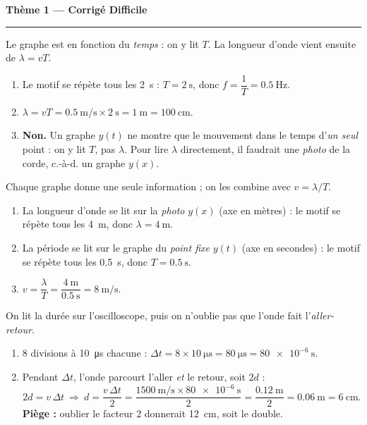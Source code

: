 \documentclass[11pt,a4paper]{article}
\begin{document}
\begin{center}
{\large\bfseries\color{excol} Thème 1 — Corrigé Difficile}\\[-2pt]
{\color{excol}\rule{5cm}{1pt}}
\end{center}

\begin{corrige}
Le graphe est en fonction du \emph{temps} : on y lit $T$. La longueur d'onde vient ensuite de
$\lambda=vT$.
\begin{enumerate}[label=\alph*)]
  \item Le motif se répète tous les \SI{2}{\second} : $T=\SI{2}{\second}$, donc
        $f=\dfrac{1}{T}=\SI{0.5}{\hertz}.$
  \item $\lambda=vT=\SI{0.5}{\metre\per\second}\times\SI{2}{\second}=\SI{1}{\metre}=\SI{100}{\centi\metre}.$
  \item \textbf{Non.} Un graphe $y(t)$ ne montre que le mouvement dans le temps d'\emph{un
        seul} point : on y lit $T$, pas $\lambda$. Pour lire $\lambda$ directement, il faudrait
        une \emph{photo} de la corde, c.-à-d. un graphe $y(x)$.
\end{enumerate}
\end{corrige}

\begin{corrige}
Chaque graphe donne une seule information ; on les combine avec $v=\lambda/T$.
\begin{enumerate}[label=\alph*)]
  \item La longueur d'onde se lit sur la \emph{photo} $y(x)$ (axe en mètres) : le motif se
        répète tous les \SI{4}{\metre}, donc $\lambda=\SI{4}{\metre}.$
  \item La période se lit sur le graphe du \emph{point fixe} $y(t)$ (axe en secondes) : le
        motif se répète tous les \SI{0.5}{\second}, donc $T=\SI{0.5}{\second}.$
  \item $v=\dfrac{\lambda}{T}=\dfrac{\SI{4}{\metre}}{\SI{0.5}{\second}}=\SI{8}{\metre\per\second}.$
\end{enumerate}
\end{corrige}

\begin{corrige}
On lit la durée sur l'oscilloscope, puis on n'oublie pas que l'onde fait l'\emph{aller-retour}.
\begin{enumerate}[label=\alph*)]
  \item 8 divisions à \SI{10}{\micro\second} chacune :
        $\Delta t = 8\times\SI{10}{\micro\second}=\SI{80}{\micro\second}=\SI{80e-6}{\second}.$
  \item Pendant $\Delta t$, l'onde parcourt l'aller \emph{et} le retour, soit $2d$ :
        \[ 2d = v\,\Delta t \ \Rightarrow\ d=\frac{v\,\Delta t}{2}
           =\frac{\SI{1500}{\metre\per\second}\times\SI{80e-6}{\second}}{2}
           =\frac{\SI{0.12}{\metre}}{2}=\SI{0.06}{\metre}=\SI{6}{\centi\metre}. \]
        \textbf{Piège :} oublier le facteur $2$ donnerait \SI{12}{\centi\metre}, soit le double.
\end{enumerate}
\end{corrige}
\end{document}
